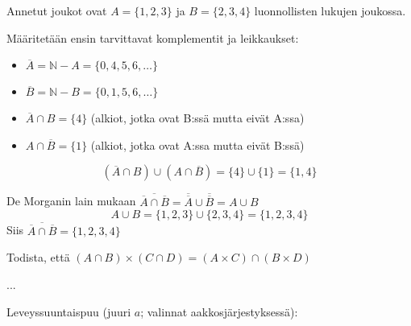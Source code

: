 \documentclass[12pt,a4paper]{article}
\newcommand{\N}{\mathbb{N}}
\begin{document}
\pagebreak
{}
\begin{kohta}
  \item %
  Annetut joukot ovat $A=\{1,2,3\}$ ja $B=\{2,3,4\}$ luonnollisten lukujen joukossa.
  
  Määritetään ensin tarvittavat komplementit ja leikkaukset:
  \begin{itemize}
      \item $\overline{A} = \N - A = \{0, 4, 5, 6, \ldots\}$
      \item $\overline{B} = \N - B = \{0, 1, 5, 6, \ldots\}$
      \item $\overline{A} \cap B = \{4\}$ (alkiot, jotka ovat B:ssä mutta eivät A:ssa)
      \item $A \cap \overline{B} = \{1\}$ (alkiot, jotka ovat A:ssa mutta eivät B:ssä)
  \end{itemize}

  \begin{alakohta}
    \item 
    \[
    (\overline{A}\cap B)\cup(A\cap\overline{B}) = \{4\} \cup \{1\} = \{1, 4\}
    \]

    \item De Morganin lain mukaan $\overline{\overline{A}\cap\overline{B}} = \overline{\overline{A}} \cup \overline{\overline{B}} = A \cup B$
    \[
    A \cup B = \{1,2,3\} \cup \{2,3,4\} = \{1,2,3,4\}
    \]
    Siis $\overline{\overline{A}\cap\overline{B}} = \{1,2,3,4\}$
  \end{alakohta}
  
  \item %
  Todista, että $(A\cap B)\times(C\cap D)=(A\times C)\cap(B\times D)$

  ...
\end{kohta}




\pagebreak


Leveyssuuntaispuu (juuri $a$; valinnat aakkosjärjestyksessä):

\begin{center}
\end{center}
\end{document}

